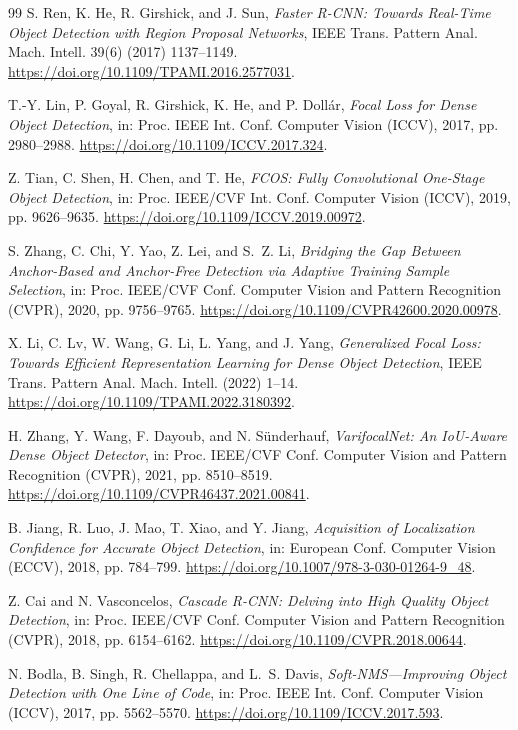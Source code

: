 \begin{thebibliography}{99}
S. Ren, K. He, R. Girshick, and J. Sun,
\emph{Faster R-CNN: Towards Real-Time Object Detection with Region Proposal
Networks}, IEEE Trans. Pattern Anal. Mach. Intell. 39(6) (2017) 1137--1149.
\url{https://doi.org/10.1109/TPAMI.2016.2577031}.

T.-Y. Lin, P. Goyal, R. Girshick, K. He, and P. Doll\'ar,
\emph{Focal Loss for Dense Object Detection},
in: Proc. IEEE Int. Conf. Computer Vision (ICCV), 2017, pp. 2980--2988.
\url{https://doi.org/10.1109/ICCV.2017.324}.

Z. Tian, C. Shen, H. Chen, and T. He,
\emph{FCOS: Fully Convolutional One-Stage Object Detection},
in: Proc. IEEE/CVF Int. Conf. Computer Vision (ICCV), 2019,
pp. 9626--9635.
\url{https://doi.org/10.1109/ICCV.2019.00972}.

S. Zhang, C. Chi, Y. Yao, Z. Lei, and S.~Z. Li,
\emph{Bridging the Gap Between Anchor-Based and Anchor-Free Detection via
Adaptive Training Sample Selection}, in: Proc. IEEE/CVF Conf. Computer Vision
and Pattern Recognition (CVPR), 2020, pp. 9756--9765.
\url{https://doi.org/10.1109/CVPR42600.2020.00978}.

X. Li, C. Lv, W. Wang, G. Li, L. Yang, and J. Yang,
\emph{Generalized Focal Loss: Towards Efficient Representation Learning for
Dense Object Detection}, IEEE Trans. Pattern Anal. Mach. Intell. (2022) 1--14.
\url{https://doi.org/10.1109/TPAMI.2022.3180392}.

H. Zhang, Y. Wang, F. Dayoub, and N. S\"underhauf,
\emph{VarifocalNet: An IoU-Aware Dense Object Detector},
in: Proc. IEEE/CVF Conf. Computer Vision and Pattern Recognition (CVPR),
2021, pp. 8510--8519.
\url{https://doi.org/10.1109/CVPR46437.2021.00841}.

B. Jiang, R. Luo, J. Mao, T. Xiao, and Y. Jiang,
\emph{Acquisition of Localization Confidence for Accurate Object Detection},
in: European Conf. Computer Vision (ECCV), 2018, pp. 784--799.
\url{https://doi.org/10.1007/978-3-030-01264-9_48}.

Z. Cai and N. Vasconcelos,
\emph{Cascade R-CNN: Delving into High Quality Object Detection},
in: Proc. IEEE/CVF Conf. Computer Vision and Pattern Recognition (CVPR),
2018, pp. 6154--6162.
\url{https://doi.org/10.1109/CVPR.2018.00644}.

N. Bodla, B. Singh, R. Chellappa, and L.~S. Davis,
\emph{Soft-NMS---Improving Object Detection with One Line of Code},
in: Proc. IEEE Int. Conf. Computer Vision (ICCV), 2017, pp. 5562--5570.
\url{https://doi.org/10.1109/ICCV.2017.593}.


\end{thebibliography}
